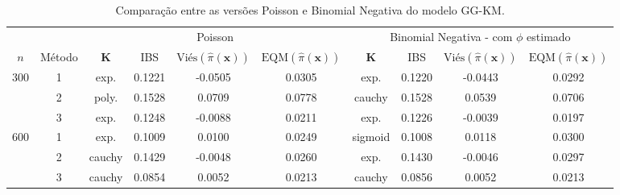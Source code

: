 \begin{table}[ht]
\centering
\footnotesize
\setlength{\tabcolsep}{3pt}
\caption{Comparação entre as versões Poisson e Binomial Negativa do modelo GG-KM.}
\label{tab:ggkm_comparison}
\begin{tabular}{cc|cccc|cccc}
\toprule
&
&
\multicolumn{4}{c|}{Poisson}
&
\multicolumn{4}{c}{Binomial Negativa - com $\phi$ estimado}
\\
\cmidrule(lr){3-6}
\cmidrule(lr){7-10}
$n$
&
Método
&
$\mathbf{K}$
&
IBS
&
$\text{Viés}\left(\hat{\pi}\left(\mathbf{x}\right)\right)$
&
$\text{EQM}\left(\hat{\pi}\left(\mathbf{x}\right)\right)$
&
$\mathbf{K}$
&
IBS
&
$\text{Viés}\left(\hat{\pi}\left(\mathbf{x}\right)\right)$
&
$\text{EQM}\left(\hat{\pi}\left(\mathbf{x}\right)\right)$
\\
\midrule

\multirow{3}{*}{300}
& 1 & exp. & 0.1221 & -0.0505 & 0.0305
    & exp. & 0.1220 & -0.0443 & 0.0292 \\

& 2 & poly. & 0.1528 & 0.0709 & 0.0778
    & cauchy & 0.1528 & 0.0539 & 0.0706 \\

& 3 & exp. & 0.1248 & -0.0088 & 0.0211
    & exp. & 0.1226 & -0.0039 & 0.0197 \\

\midrule

\multirow{3}{*}{600}
& 1 & exp. & 0.1009 & 0.0100 & 0.0249
    & sigmoid & 0.1008 & 0.0118 & 0.0300 \\

& 2 & cauchy & 0.1429 & -0.0048 & 0.0260
    & exp. & 0.1430 & -0.0046 & 0.0297 \\

& 3 & cauchy & 0.0854 & 0.0052 & 0.0213
    & cauchy & 0.0856 & 0.0052 & 0.0213 \\

\bottomrule
\end{tabular}
\end{table}




